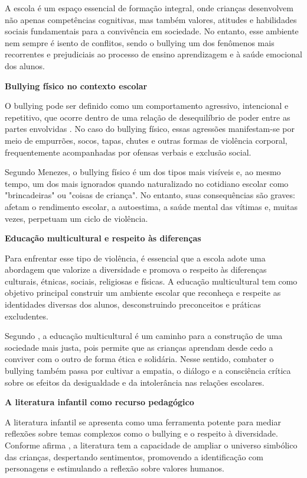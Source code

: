 A escola é um espaço essencial de formação integral, onde crianças desenvolvem não apenas competências cognitivas, mas também valores, atitudes e habilidades sociais fundamentais para a convivência em sociedade. No entanto, esse ambiente nem sempre é isento de conflitos, sendo o bullying um dos fenômenos mais recorrentes e prejudiciais ao processo de ensino aprendizagem e à saúde emocional dos alunos.

\textbf{Bullying físico no contexto escolar}

O bullying pode ser definido como um comportamento agressivo, intencional e repetitivo, que ocorre dentro de uma relação de desequilíbrio de poder entre as partes envolvidas . No caso do bullying físico, essas agressões manifestam-se por meio de empurrões, socos, tapas, chutes e outras formas de violência corporal, frequentemente acompanhadas por ofensas verbais e exclusão social.

\begin{citacao}
	Segundo Menezes, o bullying físico é um dos tipos mais visíveis e, ao mesmo tempo, um dos mais ignorados quando naturalizado no cotidiano escolar como "brincadeiras" ou "coisas de criança". No entanto, suas consequências são graves: afetam o rendimento escolar, a autoestima, a saúde mental das vítimas e, muitas vezes, perpetuam um ciclo de violência. \cite[p.123-138]{IzabelMenezes} 
\end{citacao}


\textbf{Educação multicultural e respeito às diferenças}

Para enfrentar esse tipo de violência, é essencial que a escola adote uma abordagem que valorize a diversidade e promova o respeito às diferenças culturais, étnicas, sociais, religiosas e físicas. A educação multicultural tem como objetivo principal construir um ambiente escolar que reconheça e respeite as identidades diversas dos alunos, desconstruindo preconceitos e práticas excludentes.

Segundo \cite{Candau}, a educação multicultural é um caminho para a construção de uma sociedade mais justa, pois permite que as crianças aprendam desde cedo a conviver com o outro de forma ética e solidária. Nesse sentido, combater o bullying também passa por cultivar a empatia, o diálogo e a consciência crítica sobre os efeitos da desigualdade e da intolerância nas relações escolares.

\textbf{A literatura infantil como recurso pedagógico}

A literatura infantil se apresenta como uma ferramenta potente para mediar reflexões sobre temas complexos como o bullying e o respeito à diversidade. Conforme afirma \cite{Coelho}, a literatura tem a capacidade de ampliar o universo simbólico das crianças, despertando sentimentos, promovendo a identificação com personagens e estimulando a reflexão sobre valores humanos.


